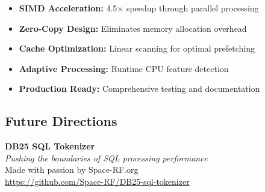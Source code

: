 \documentclass[11pt,a4paper]{article}
\begin{document}
\begin{itemize}
    \item \textbf{SIMD Acceleration:} 4.5$\times$ speedup through parallel processing
    \item \textbf{Zero-Copy Design:} Eliminates memory allocation overhead
    \item \textbf{Cache Optimization:} Linear scanning for optimal prefetching
    \item \textbf{Adaptive Processing:} Runtime CPU feature detection
    \item \textbf{Production Ready:} Comprehensive testing and documentation
\end{itemize}

\subsection{Future Directions}


\vspace{1cm}

\begin{center}
\large
\textbf{DB25 SQL Tokenizer}\\
\textit{Pushing the boundaries of SQL processing performance}\\
\vspace{0.5cm}
Made with passion by Space-RF.org\\
\url{https://github.com/Space-RF/DB25-sql-tokenizer}
\end{center}
\end{document}
